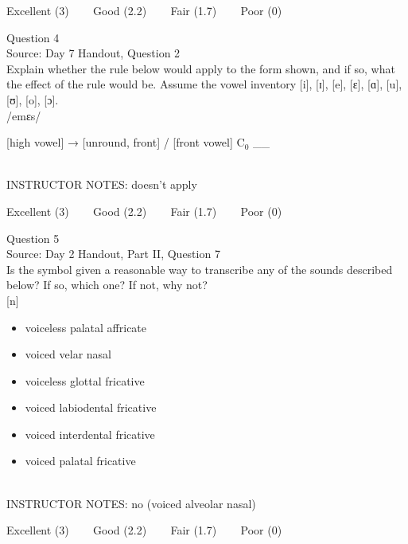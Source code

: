 \documentclass[12pt]{article}
\begin{document}
\vfill
Excellent (3) ~~~ Good (2.2) ~~~ Fair (1.7) ~~~ Poor (0)
\newpage

{\large Question 4}\\

Source: Day 7 Handout, Question 2\\

Explain whether the rule below would apply to the form shown, and if so, what the effect of the rule would be. Assume the vowel inventory [i], [ɪ], [e], [ɛ], [ɑ], [u], [ʊ], [o], [ɔ].\\

/emɛs/

{[high vowel]} →  {[unround, front]} / {[front vowel]} C$_0$ \_\_ 


~\\
INSTRUCTOR NOTES: doesn't apply


\vfill
Excellent (3) ~~~ Good (2.2) ~~~ Fair (1.7) ~~~ Poor (0)
\newpage

{\large Question 5}\\

Source: Day 2 Handout, Part II, Question 7\\

Is the symbol given a reasonable way to transcribe any of the sounds described below? If so, which one? If not, why not?\\

{[n]}

\begin{itemize} \item voiceless palatal affricate \item voiced velar nasal \item voiceless glottal fricative \item voiced labiodental fricative \item voiced interdental fricative \item voiced palatal fricative \end{itemize}


~\\
INSTRUCTOR NOTES: no (voiced alveolar nasal)


\vfill
Excellent (3) ~~~ Good (2.2) ~~~ Fair (1.7) ~~~ Poor (0)
\newpage

\begin{center}
\textbf{{\color{red}{\HUGE END OF EXAM}}}\\

\end{center}
\newpage

\begin{center}
\textbf{{\color{blue}{\HUGE START OF EXAM\\}}}

\textbf{{\color{blue}{\HUGE Student ID: 3420\\}}}

\textbf{{\color{blue}{\HUGE 3:00 - 3:15 PM\\}}}

\end{center}
\newpage
\end{document}
